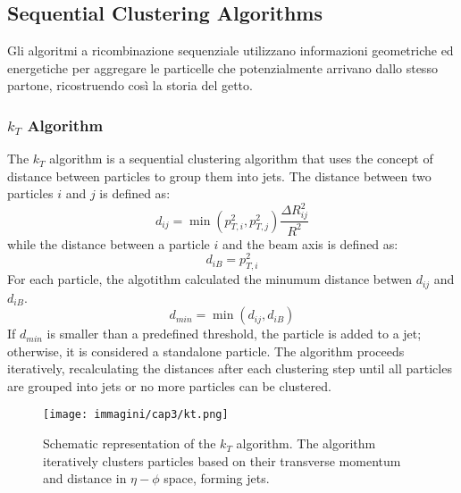 \subsection{Sequential Clustering Algorithms}
Gli algoritmi a ricombinazione sequenziale utilizzano informazioni geometriche ed energetiche per aggregare le particelle che potenzialmente arrivano dallo stesso partone, ricostruendo così la storia del getto.

\subsubsection{$k_T$ Algorithm}
The $k_T$ algorithm is a sequential clustering algorithm that uses the concept of distance between particles to group them into jets. The distance between two particles $i$ and $j$ is defined as:
\begin{equation}
    d_{ij} = \min(p_{T,i}^2, p_{T,j}^2) \dfrac{\Delta R_{ij}^2}{R^2}
\end{equation}
while the distance between a particle $i$ and the beam axis is defined as:
\begin{equation}
    d_{iB} = p_{T,i}^{2}
\end{equation}
For each particle, the algotithm calculated the minumum distance betwen $d_{ij}$ and $d_{iB}$. 
\begin{equation}
    d_{min} = \min(d_{ij}, d_{iB})
\end{equation}
If $d_{min}$ is smaller than a predefined threshold, the particle is added to a jet; otherwise, it is considered a standalone particle. The algorithm proceeds iteratively, recalculating the distances after each clustering step until all particles are grouped into jets or no more particles can be clustered.

\begin{figure}[h!]
    \centering
    \texttt{[image: immagini/cap3/kt.png]}
    \caption{Schematic representation of the $k_T$ algorithm. The algorithm iteratively clusters particles based on their transverse momentum and distance in $\eta - \phi$ space, forming jets.}
    \label{fig:kt_algorithm}
\end{figure}

